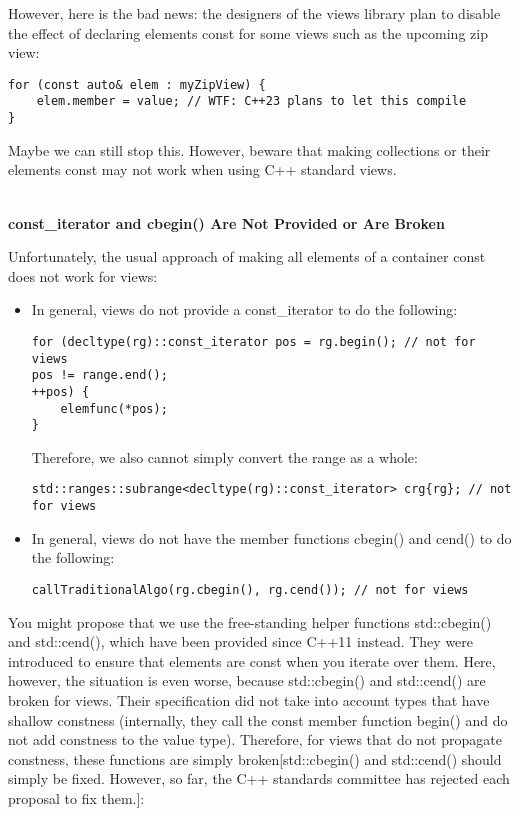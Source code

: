 However, here is the bad news: the designers of the views library plan to disable the effect of declaring elements const for some views such as the upcoming zip view:

\begin{lstlisting}[style=styleCXX]
for (const auto& elem : myZipView) {
	elem.member = value; // WTF: C++23 plans to let this compile
}
\end{lstlisting}

Maybe we can still stop this. However, beware that making collections or their elements const may not work when using C++ standard views.

\noindent
\hspace*{\fill} \\ %
\textbf{const\_iterator and cbegin() Are Not Provided or Are Broken}

Unfortunately, the usual approach of making all elements of a container const does not work for views:

\begin{itemize}
\item
In general, views do not provide a const\_iterator to do the following:

\begin{lstlisting}[style=styleCXX]
for (decltype(rg)::const_iterator pos = rg.begin(); // not for views
pos != range.end();
++pos) {
	elemfunc(*pos);
}
\end{lstlisting}

Therefore, we also cannot simply convert the range as a whole:

\begin{lstlisting}[style=styleCXX]
std::ranges::subrange<decltype(rg)::const_iterator> crg{rg}; // not for views
\end{lstlisting}

\item
In general, views do not have the member functions cbegin() and cend() to do the following:

\begin{lstlisting}[style=styleCXX]
callTraditionalAlgo(rg.cbegin(), rg.cend()); // not for views
\end{lstlisting}
\end{itemize}

You might propose that we use the free-standing helper functions std::cbegin() and std::cend(), which have been provided since C++11 instead. They were introduced to ensure that elements are const when you iterate over them. Here, however, the situation is even worse, because std::cbegin() and std::cend() are broken for views. Their specification did not take into account types that have shallow constness (internally, they call the const member function begin() and do not add constness to the value type). Therefore, for views that do not propagate constness, these functions are simply broken[std::cbegin() and std::cend() should simply be fixed. However, so far, the C++ standards committee has rejected each proposal to fix them.]:

